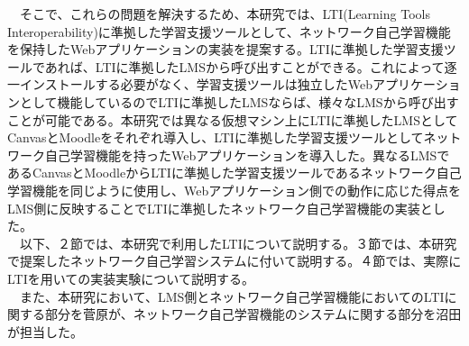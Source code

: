 　そこで、これらの問題を解決するため、本研究では、LTI(Learning Tools Interoperability)に準拠した学習支援ツールとして、ネットワーク自己学習機能を保持したWebアプリケーションの実装を提案する。LTIに準拠した学習支援ツールであれば、LTIに準拠したLMSから呼び出すことができる。これによって逐一インストールする必要がなく、学習支援ツールは独立したWebアプリケーションとして機能しているのでLTIに準拠したLMSならば、様々なLMSから呼び出すことが可能である。本研究では異なる仮想マシン上にLTIに準拠したLMSとしてCanvasとMoodleをそれぞれ導入し、LTIに準拠した学習支援ツールとしてネットワーク自己学習機能を持ったWebアプリケーションを導入した。異なるLMSであるCanvasとMoodleからLTIに準拠した学習支援ツールであるネットワーク自己学習機能を同じように使用し、Webアプリケーション側での動作に応じた得点をLMS側に反映することでLTIに準拠したネットワーク自己学習機能の実装とした。\\
　以下、２節では、本研究で利用したLTIについて説明する。３節では、本研究で提案したネットワーク自己学習システムに付いて説明する。４節では、実際にLTIを用いての実装実験について説明する。\\
　また、本研究において、LMS側とネットワーク自己学習機能においてのLTIに関する部分を菅原が、ネットワーク自己学習機能のシステムに関する部分を沼田が担当した。
